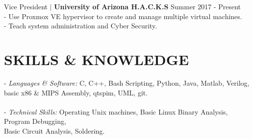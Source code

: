 \documentclass[line, 12pt]{res}
\newcommand\tab[1][0.5cm]{\hspace*{#1}}
\begin{document}
\begin{resume}
	Vice President $\mid$ \textbf{University of Arizona H.A.C.K.S} \hfill Summer 2017 - Present \\
		\tab - Use Proxmox VE hypervisor to create and manage multiple virtual machines. \\
		\tab - Teach system administration and Cyber Security.

\section{SKILLS \& KNOWLEDGE} 
	- {\sl Languages \& Software:} C, C++, Bash Scripting, Python, Java, Matlab, Verilog, \\ \tab[4.48cm] basic x86 \& MIPS Assembly, qtspim, UML, git. \\ \\
	- {\sl Technical Skills:} Operating Unix machines, Basic Linux Binary Analysis, Program Debugging, \\ \tab[3.25cm] Basic Circuit Analysis, Soldering.
 

\end{resume}
\end{document}
